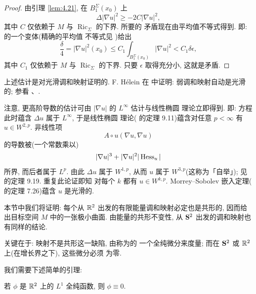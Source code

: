 \begin{proof}
由引理 \ref{lem:4.21}, 在 $B^\Sigma_1(x_0)$ 上
\begin{equation*}
\Delta|\nabla u|^2\geq-2C|\nabla u|^2,
\end{equation*}
其中 $C$ 仅依赖于 $M$ 与 $\operatorname{Ric}_\Sigma$ 的下界. 所要的
矛盾现在由平均值不等式得到. 即:  的一个变体(精确的平均值
不等式见 \cite{LiSc})给出
\begin{equation}
\frac{\delta}{4}=|\nabla u|^2(x_0)
 \leq C_1\int_{B^\Sigma_1(x_0)}|\nabla u|^2<C_1\delta\epsilon,
\label{eq:4.49}
\end{equation}
其中 $C_1$ 仅依赖于 $M$ 与 $\operatorname{Ric}_\Sigma$ 的下界. 只要
$\epsilon$ 取得充分小, 这就是矛盾.
\end{proof}

\begin{remark}
\label{rem:4.23}
上述估计是对光滑调和映射证明的. F. H\'elein 在 \cite{Hf2} 中证明:
弱调和映射自动是光滑的; 参看 \cite{Rt}、\cite{RtSt}.
\end{remark}

注意, 更高阶导数的估计可由 $|\nabla u|$ 的 $L^\infty$ 估计与线性椭圆
理论立即得到. 即: 方程此时蕴含 $\Delta u$ 属于 $L^\infty$, 于是线性椭圆
理论(\cite{GiTr} 的定理 9.11)蕴含对任意 $p<\infty$ 有 $u\in W^{2,p}$.
非线性项
\begin{equation}
A\circ u(\nabla u,\nabla u)
\label{eq:4.50}
\end{equation}
的导数被(一个常数乘以)
\begin{equation}
|\nabla u|^3+|\nabla u|^2|\operatorname{Hess}_u|
\label{eq:4.51}
\end{equation}
所界, 而后者属于 $L^p$. 由此 $\Delta u$ 属于 $W^{1,p}$, 从而 $u$ 属于
$W^{3,p}$(这称为「自举」); 见 \cite{GiTr} 的定理 9.19. 重复此论证即知
对每个 $k$ 都有 $u\in W^{k,p}$. Morrey--Sobolev 嵌入定理(\cite{GiTr}
的定理 7.26)蕴含 $u$ 是光滑的.

本节中我们将证明: 每个从 $\mathbb{R}^2$ 出发的有限能量调和映射必定也是共形的,
因而给出目标空间 $M$ 中的一张极小曲面. 由能量的共形不变性, 从 $\mathbf{S}^2$
出发的调和映射也有同样的结论.

关键在于: 映射不是共形这一缺陷, 由称为的
一个全纯微分来度量; 而在 $\mathbf{S}^2$ 或 $\mathbb{R}^2$ 上(在增长界之下), 这些微分必须
为零.

我们需要下述简单的引理:

\begin{lemma}
\label{lem:4.24}
若 $\phi$ 是 $\mathbb{R}^2$ 上的 $L^1$ 全纯函数, 则 $\phi\equiv0$.
\end{lemma}

